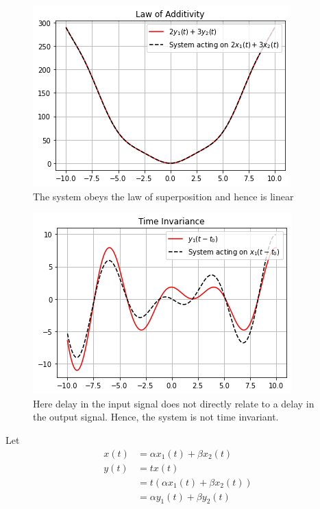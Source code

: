  \begin{figure}[!ht]
\centering
 \includegraphics[width=\columnwidth]{solutions/ec/2000/1/13/figures/linear.png}
 \caption{The system obeys the law of superposition and hence is linear}
 \end{figure}
  \begin{figure}[!ht]
\centering
 \includegraphics[width=\columnwidth]{solutions/ec/2000/1/13/figures/Time variant.png}
 \caption{Here delay in the input signal does not directly relate to a delay in the output signal. Hence, the system is not time invariant. }
 \label{ec/2000/1/13/fig4}
 \end{figure}
 Let
 \begin{align}
     x(t)&=\alpha x_1(t)+\beta x_2(t) \\
     y(t)&=tx(t)\\
     &=t(\alpha x_1(t)+\beta x_2(t))\\
     &=\alpha y_1(t) + \beta y_2(t)
 \end{align}

